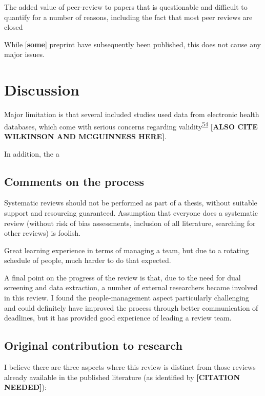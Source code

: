 \documentclass[a4paper, twoside]{templates/ociamthesis}
\begin{document}
The added value of peer-review to papers that is questionable and difficult to quantify for a number of reasons, including the fact that most peer reviews are closed

While {[}\textbf{some}{]} preprint have subsequently been published, this does not cause any major issues.

\hypertarget{discussion-1}{%
\section{Discussion}\label{discussion-1}}

Major limitation is that several included studies used data from electronic health databases, which come with serious concerns regarding validity\textsuperscript{\protect\hyperlink{ref-hsieh2019}{54}} \textbf{{[}ALSO CITE WILKINSON AND MCGUINNESS HERE{]}}.

In addition, the a

\hypertarget{comments-on-the-process}{%
\subsection{Comments on the process}\label{comments-on-the-process}}

Systematic reviews should not be performed as part of a thesis, without suitable support and resourcing guaranteed. Assumption that everyone does a systematic review (without risk of bias assessments, inclusion of all literature, searching for other reviews) is foolish.

Great learning experience in terms of managing a team, but due to a rotating schedule of people, much harder to do that expected.

A final point on the progress of the review is that, due to the need for dual screening and data extraction, a number of external researchers became involved in this review. I found the people-management aspect particularly challenging and could definitely have improved the process through better communication of deadlines, but it has provided good experience of leading a review team.

\hypertarget{original-contribution-to-research}{%
\subsection{Original contribution to research}\label{original-contribution-to-research}}

I believe there are three aspects where this review is distinct from those reviews already available in the published literature (as identified by \textbf{{[}CITATION NEEDED{]}}):
\end{document}
